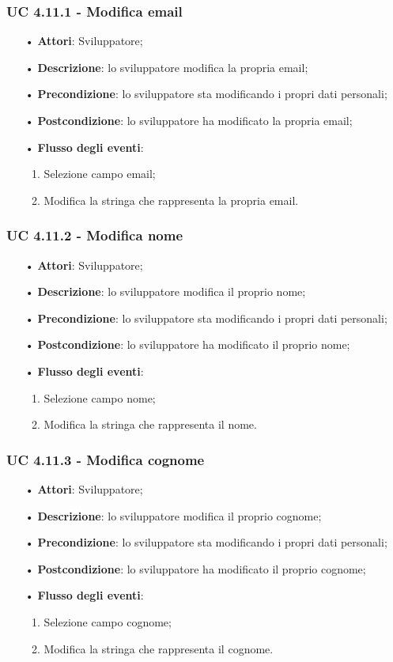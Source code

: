 \subsubsection{UC 4.11.1 - Modifica email}
\begin{itemize}
	\item[•]\textbf{Attori}: Sviluppatore;
	\item[•]\textbf{Descrizione}: lo sviluppatore modifica la propria email;
	\item[•]\textbf{Precondizione}: lo sviluppatore sta modificando i propri dati personali;
	\item[•]\textbf{Postcondizione}: lo sviluppatore ha modificato la propria email; 
	\item[•]\textbf{Flusso degli eventi}: 
	\begin{enumerate}
		\item Selezione campo email;
		\item Modifica la stringa che rappresenta la propria email.
	\end{enumerate}
\end{itemize}
\subsubsection{UC 4.11.2 - Modifica nome}
\begin{itemize}
	\item[•]\textbf{Attori}: Sviluppatore;
	\item[•]\textbf{Descrizione}: lo sviluppatore modifica il proprio nome;
	\item[•]\textbf{Precondizione}: lo sviluppatore sta modificando i propri dati personali;
	\item[•]\textbf{Postcondizione}: lo sviluppatore ha modificato il proprio nome; 
	\item[•]\textbf{Flusso degli eventi}: 
	\begin{enumerate}
		\item Selezione campo nome;
		\item Modifica la stringa che rappresenta il nome.
	\end{enumerate}
\end{itemize}
\subsubsection{UC 4.11.3 - Modifica cognome}
\begin{itemize}
	\item[•]\textbf{Attori}: Sviluppatore;
	\item[•]\textbf{Descrizione}: lo sviluppatore modifica il proprio cognome;
	\item[•]\textbf{Precondizione}: lo sviluppatore sta modificando i propri dati personali;
	\item[•]\textbf{Postcondizione}: lo sviluppatore ha modificato il proprio cognome; 
	\item[•]\textbf{Flusso degli eventi}: 
	\begin{enumerate}
		\item Selezione campo cognome;
		\item Modifica la stringa che rappresenta il cognome.
	\end{enumerate}
\end{itemize}
